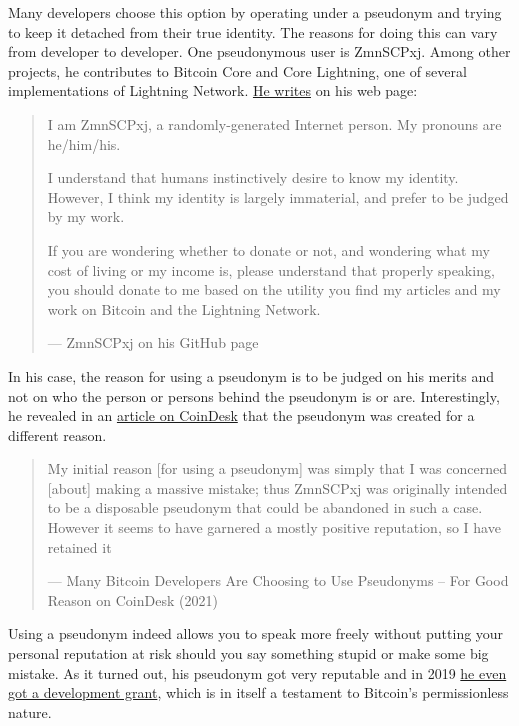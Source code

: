 Many developers choose this option by operating under a pseudonym and
trying to keep it detached from their true identity. The reasons for
doing this can vary from developer to developer. One pseudonymous user
is ZmnSCPxj. Among other projects, he contributes to Bitcoin Core and
Core Lightning, one of several implementations of Lightning Network.
\href{https://zmnscpxj.github.io/about.html}{He writes} on his web page:

\begin{quote}
I am ZmnSCPxj, a randomly-generated Internet person. My pronouns are
he/him/his.

I understand that humans instinctively desire to know my identity.
However, I think my identity is largely immaterial, and prefer to be
judged by my work.

If you are wondering whether to donate or not, and wondering what my
cost of living or my income is, please understand that properly
speaking, you should donate to me based on the utility you find my
articles and my work on Bitcoin and the Lightning Network.

---  ZmnSCPxj on his GitHub page
\end{quote}

In his case, the reason for using a pseudonym is to be judged on his
merits and not on who the person or persons behind the pseudonym is or
are. Interestingly, he revealed in an
\href{https://www.coindesk.com/markets/2020/06/29/many-bitcoin-developers-are-choosing-to-use-pseudonyms-for-good-reason/}{article
on CoinDesk} that the pseudonym was created for a different reason.

\begin{quote}
My initial reason {[}for using a pseudonym{]} was simply that I was
concerned {[}about{]} making a massive mistake; thus ZmnSCPxj was
originally intended to be a disposable pseudonym that could be abandoned
in such a case. However it seems to have garnered a mostly positive
reputation, so I have retained it

---  Many Bitcoin Developers Are Choosing to Use Pseudonyms -- For Good
Reason on CoinDesk (2021)
\end{quote}

Using a pseudonym indeed allows you to speak more freely without putting
your personal reputation at risk should you say something stupid or make
some big mistake. As it turned out, his pseudonym got very reputable and
in 2019
\href{https://twitter.com/spiralbtc/status/1204815615678177280}{he even
got a development grant}, which is in itself a testament to Bitcoin's
permissionless nature.

